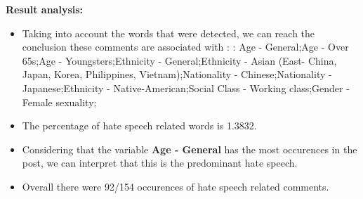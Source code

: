 \documentclass[11pt]{article}
\begin{document}
\textbf{\Large Result analysis:}

\begin{itemize}\item Taking into account the words that were detected, we can reach the conclusion these comments are associated with : : Age - General;Age - Over 65s;Age - Youngsters;Ethnicity - General;Ethnicity - Asian (East- China, Japan, Korea, Philippines, Vietnam);Nationality - Chinese;Nationality - Japanese;Ethnicity - Native-American;Social Class - Working class;Gender - Female sexuality;%

\item The percentage of hate speech related words is 1.3832.

\item Considering that the variable \textbf{Age - General} has the most occurences in the post, we can interpret that this is the predominant hate speech.

\item Overall there were 92/154 occurences of hate speech related comments.\end{itemize}
\end{document}
